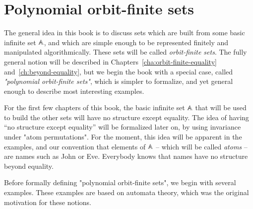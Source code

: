 \chapter{Polynomial orbit-finite sets}
\label{sec:pof-sets}

The general idea in this book is to discuss sets which are built from some basic infinite set $\mathbb A$, and which are simple enough to be represented finitely and manipulated algorithmically. These sets will be called \emph{orbit-finite sets}. The fully general notion will be described in Chapters~\ref{cha:orbit-finite-equality} and~\ref{ch:beyond-equality}, but we begin  the book with a special case, called \emph{"polynomial orbit-finite sets"}, which is simpler to formalize, and yet general enough to describe most interesting examples. 

For the first few chapters of this book, the  basic infinite set $\mathbb A$ that will be used to build the other sets will have no structure except equality. The idea of having ``no structure except equality'' will be formalized later on, by using invariance under "atom permutations". For the moment, this idea will be apparent in the examples, and our convention that elements of $\mathbb A$ -- which will be called \emph{atoms} -- are names such as John or Eve. Everybody knows that names have no structure beyond equality.

Before formally defining "polynomial orbit-finite sets", we begin with several examples. These  examples are based on automata theory, which was the original motivation for these notions.


